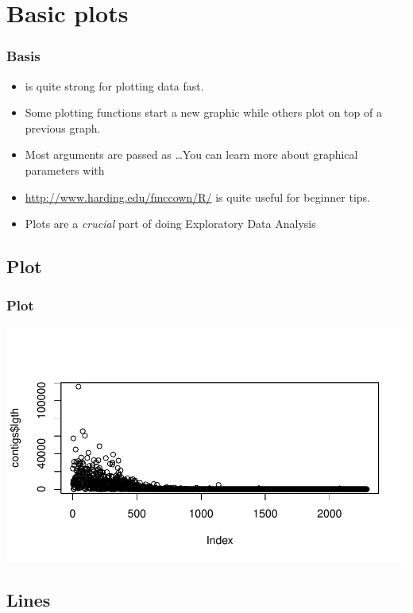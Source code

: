 \section{Basic  plots}

\begin{frame}[allowframebreaks]
  \frametitle{Basis}
  \begin{itemize}
  \item {} is quite strong for plotting data fast.
  \item Some plotting functions start a new graphic while others plot on top of a previous graph.
  \item Most arguments are passed as \ldots You can learn more about graphical parameters with 
  \item \url{http://www.harding.edu/fmccown/R/} is quite useful for beginner tips.
  \item Plots are a \emph{crucial} part of doing \alert{Exploratory Data Analysis}
  \end{itemize}
\end{frame}

\subsection{Plot}

\begin{frame}
  \frametitle{Plot}
\begin{Schunk}
\end{Schunk}
\includegraphics{plots/fig-024}
\end{frame}

\subsection{Lines}

